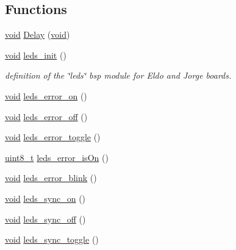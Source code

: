 \subsection*{Functions}
\begin{DoxyCompactItemize}
\item 
\hyperlink{usb__devapi_8h_afabf60e7f57651d6d595a02c75f07cd0}{void} \hyperlink{iot-lab___m3_2leds_8c_a50fc5352e9082c30aa33a10ce5d9e409}{Delay} (\hyperlink{usb__devapi_8h_afabf60e7f57651d6d595a02c75f07cd0}{void})
\item 
\hyperlink{usb__devapi_8h_afabf60e7f57651d6d595a02c75f07cd0}{void} \hyperlink{group__leds_ga67cfc3137a465e560792490e81365254}{leds\+\_\+init} ()
\begin{DoxyCompactList}\small\item\em definition of the \char`\"{}leds\char`\"{} bsp module for Eldo and Jorge boards. \end{DoxyCompactList}\item 
\hyperlink{usb__devapi_8h_afabf60e7f57651d6d595a02c75f07cd0}{void} \hyperlink{group__leds_ga248d93c2ed295c1c463984b881e1b9af}{leds\+\_\+error\+\_\+on} ()
\item 
\hyperlink{usb__devapi_8h_afabf60e7f57651d6d595a02c75f07cd0}{void} \hyperlink{group__leds_ga4639337fca09b91f2136c2843a19e1b3}{leds\+\_\+error\+\_\+off} ()
\item 
\hyperlink{usb__devapi_8h_afabf60e7f57651d6d595a02c75f07cd0}{void} \hyperlink{group__leds_gaa0f84f5b86315c3eed24fc48a826f991}{leds\+\_\+error\+\_\+toggle} ()
\item 
\hyperlink{_p_e___types_8h_aba7bc1797add20fe3efdf37ced1182c5}{uint8\+\_\+t} \hyperlink{group__leds_ga49f878b007c160726b61f01fa6afce85}{leds\+\_\+error\+\_\+is\+On} ()
\item 
\hyperlink{usb__devapi_8h_afabf60e7f57651d6d595a02c75f07cd0}{void} \hyperlink{group__leds_gab68d0db5256aabc4415415f1b33acab5}{leds\+\_\+error\+\_\+blink} ()
\item 
\hyperlink{usb__devapi_8h_afabf60e7f57651d6d595a02c75f07cd0}{void} \hyperlink{group__leds_gaf1a59644fa7758343d6666e18a4c484c}{leds\+\_\+sync\+\_\+on} ()
\item 
\hyperlink{usb__devapi_8h_afabf60e7f57651d6d595a02c75f07cd0}{void} \hyperlink{group__leds_gafe7544b92ce4fb0eccb46179741ac32b}{leds\+\_\+sync\+\_\+off} ()
\item 
\hyperlink{usb__devapi_8h_afabf60e7f57651d6d595a02c75f07cd0}{void} \hyperlink{group__leds_ga5f8c9297538313c763dfe6cdd5ed8573}{leds\+\_\+sync\+\_\+toggle} ()
\item 

\end{DoxyCompactItemize}
